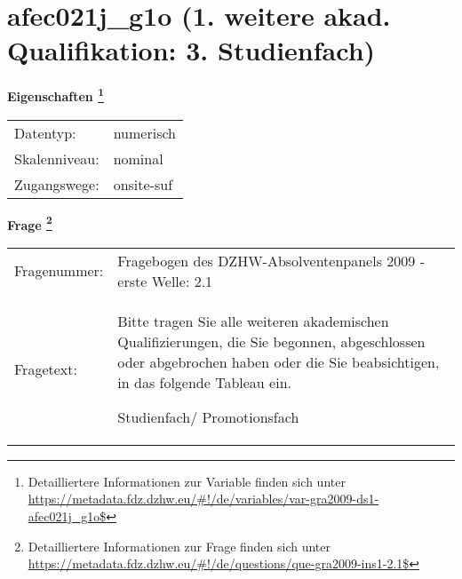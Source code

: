 
    \setcounter{footnote}{0}

    \vspace*{-1.8cm}
	\section{afec021j\_g1o (1. weitere akad. Qualifikation: 3. Studienfach)}
	\label{section:afec021j_g1o}



    \vspace*{0.5cm}
    \noindent\textbf{Eigenschaften
	\footnote{Detailliertere Informationen zur Variable finden sich unter
		\url{https://metadata.fdz.dzhw.eu/\#!/de/variables/var-gra2009-ds1-afec021j_g1o$}}}\\
	\begin{tabularx}{\hsize}{@{}lX}
	Datentyp: & numerisch \\
	Skalenniveau: & nominal \\
	Zugangswege: &
	  onsite-suf
 \\
    \end{tabularx}



				\vspace*{0.5cm}
                \noindent\textbf{Frage
	                \footnote{Detailliertere Informationen zur Frage finden sich unter
		              \url{https://metadata.fdz.dzhw.eu/\#!/de/questions/que-gra2009-ins1-2.1$}}}\\
				\begin{tabularx}{\hsize}{@{}lX}
					Fragenummer: &
					  Fragebogen des DZHW-Absolventenpanels 2009 - erste Welle:
					  2.1
 \\
					Fragetext: & Bitte tragen Sie alle weiteren akademischen Qualifizierungen, die Sie begonnen, abgeschlossen oder abgebrochen haben oder die Sie beabsichtigen, in das folgende Tableau ein.\par  Studienfach/ Promotionsfach \\
				\end{tabularx}






